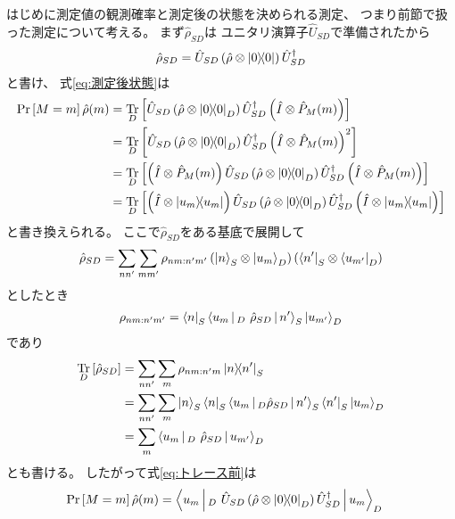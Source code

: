 \documentclass[a4paper, 10pt, uplatex]{jsarticle}
\begin{document}
はじめに測定値の観測確率と測定後の状態を決められる測定、
つまり前節で扱った測定について考える。
まず$\hat{\rho}_{SD}$は
ユニタリ演算子$\hat{U}_{SD}$で準備されたから
\begin{align}
	\hat{\rho}_{SD}
	= \hat{U}_{SD} \left( \hat{\rho} \otimes \Ket{0} \! \! \Bra{0} \right)
	\hat{U}_{SD}^\dagger
\end{align}
と書け、
式\eqref{eq:測定後状態}は
\begin{align}
	\Pr \left[ M = m \right] \hat{\rho} (m)
	&= \Tr_D \left[ \hat{U}_{SD} \left( \hat{\rho} \otimes \Ketbra{0}{0}_D
	\right) \hat{U}_{SD}^\dagger \left( \hat{I} \otimes \hat{P}_M (m) \right)
	\right]
	\label{eq:相互作用付きの相互作用状態} \\
	&= \Tr_D \left[ \hat{U}_{SD} \left( \hat{\rho} \otimes \Ketbra{0}{0}_D
	\right) \hat{U}_{SD}^\dagger \left( \hat{I} \otimes \hat{P}_M (m) \right)^2
	\right] \\
	&= \Tr_D \left[ \left( \hat{I} \otimes \hat{P}_M (m) \right) \hat{U}_{SD}
	\left( \hat{\rho} \otimes \Ketbra{0}{0}_D \right) \hat{U}_{SD}^\dagger
	\left( \hat{I} \otimes \hat{P}_M (m) \right) \right] \\
	&= \Tr_D \left[ \left( \hat{I} \otimes \Ketbra{u_m}{u_m} \right)
	\hat{U}_{SD} \left( \hat{\rho} \otimes \Ketbra{0}{0}_D \right)
	\hat{U}_{SD}^\dagger \left( \hat{I} \otimes \Ketbra{u_m}{u_m} \right)
	\right]
	\label{eq:トレース前}
\end{align}
と書き換えられる。
ここで$\hat{\rho}_{SD}$をある基底で展開して
\begin{align}
	\hat{\rho}_{SD}
	= \sum_{nn'} \sum_{mm'} \rho_{nm:n'm'}
	\left( \Ket{n}_S \otimes \Ket{u_m}_D \right)
	\left( \Bra{n'}_S \otimes \Bra{u_{m'}}_D \right)
\end{align}
としたとき
\begin{align}
	\rho_{nm:n'm'}
	= \Bra{n}_S \Braket{u_m |_D \ \hat{\rho}_{SD} | n'}_S
	\Ket{u_{m'}}_D
\end{align}
であり
\begin{align}
	\operatorname*{Tr}_D \left[ \hat{\rho}_{SD} \right]
	&= \sum_{nn'} \sum_m \rho_{nm:n'm} \Ket{n} \! \! \Bra{n'}_S \\
	&= \sum_{nn'} \sum_m \Ket{n}_S
	\Bra{n}_S \Braket{u_m |_D \hat{\rho}_{SD} | n'}_S
	\Bra{n'}_S \Ket{u_{m}}_D \\
	&= \sum_m \Braket{u_m |_D\ \hat{\rho}_{SD} | u_{m'}}_D
\end{align}
とも書ける。
したがって式\eqref{eq:トレース前}は
\begin{align}
	\Pr \left[ M = m \right] \hat{\rho} (m)
	&= \Braket{u_m |_D \ 
	\hat{U}_{SD} \left( \hat{\rho} \otimes \Ketbra{0}{0}_D \right)
	\hat{U}_{SD}^\dagger | u_m}_D
\end{align}
\end{document}
